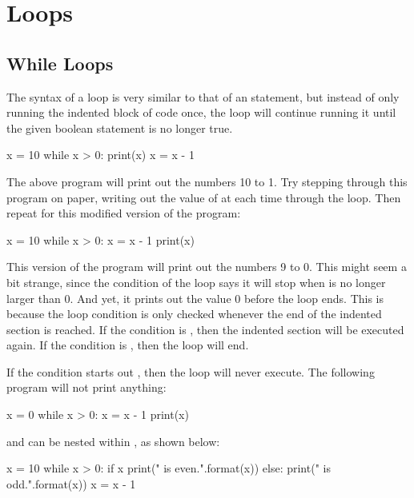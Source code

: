 \documentclass[11pt]{cselabheader}
\begin{document}
\pagebreak
\section{Loops}

\subsection{While Loops}
The syntax of a  loop is very similar to that of an
 statement, but instead of only running the indented block of code
once, the  loop will continue running it until the given
boolean statement is no longer true.

\begin{python3code}
x = 10
while x > 0:
    print(x)
    x = x - 1
\end{python3code}

The above program will print out the numbers 10 to 1. Try stepping through this
program on paper, writing out the value of  at each time through
the loop. Then repeat for this modified version of the program:

\begin{python3code}
x = 10
while x > 0:
    x = x - 1
    print(x)
\end{python3code}

This version of the program will print out the numbers 9 to 0. This might seem a
bit strange, since the condition of the loop says it will stop when
 is no longer larger than 0. And yet, it prints out the value 0
before the loop ends. This is because the loop condition is only checked
whenever the end of the indented section is reached. If the condition is
, then the indented section will be executed again. If the
condition is , then the loop will end.

If the condition starts out , then the loop will never execute.
The following program will not print anything:

\begin{python3code}
x = 0
while x > 0:
    x = x - 1
    print(x)
\end{python3code}

 and  can be nested within
, as shown below:

\begin{python3code}
x = 10
while x > 0:
    if x %
        print("{} is even.".format(x))
    else:
        print("{} is odd.".format(x))
    x = x - 1
\end{python3code}
\end{document}
